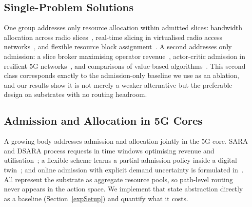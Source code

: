 \documentclass[10pt,journal,comsoc]{IEEEtran}
\begin{document}
\subsection{Single-Problem Solutions}
One group addresses only resource allocation within admitted slices:
bandwidth allocation across radio slices~\cite{kim2019reinforcement},
real-time slicing in virtualised radio access
networks~\cite{van2019optimal}, and flexible resource block
assignment~\cite{abiko2020flexible}. A second addresses only admission: a
slice broker maximising operator revenue~\cite{sciancalepore2019rl},
actor-critic admission in resilient 5G networks~\cite{10293471}, and
comparisons of value-based algorithms~\cite{9771643,10437226,Tao_2025}.
This second class corresponds exactly to the admission-only baseline we
use as an ablation, and our results show it is not merely a weaker
alternative but the preferable design on substrates with no routing
headroom.

\subsection{Admission and Allocation in 5G Cores}
A growing body addresses admission and allocation jointly in the 5G core.
SARA and DSARA process requests in time windows optimising revenue and
utilisation~\cite{villota2022admission}; a flexible scheme learns a
partial-admission policy inside a digital twin~\cite{wang2024fsac}; and
online admission with explicit demand uncertainty is formulated
in~\cite{sulaiman2025datadriven}. All represent the substrate as aggregate
resource pools, so path-level routing never appears in the action space.
We implement that state abstraction directly as a baseline
(Section~\ref{expSetup}) and quantify what it costs.
\end{document}

